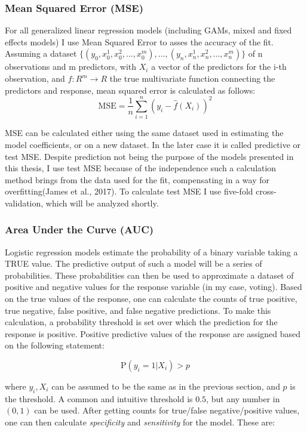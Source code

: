 \documentclass[12pt,twoside]{reedthesis}
\begin{document}
  \subsubsection{Mean Squared Error (MSE)}\label{mean-squared-error-mse}
  
  For all generalized linear regression models (including GAMs, mixed and
  fixed effects models) I use Mean Squared Error to asses the accuracy of
  the fit. Assuming a dataset
  \(\{(y_0, x_0^1, x_0^2, ..., x_0^m),...,(y_n, x_n^1, x_n^2, ..., x_n^m)\}\)
  of n observations and m predictors, with \(X_i\) a vector of the
  predictors for the i-th observation, and \(f:R^m \to R\) the true
  multivariate function connecting the predictors and response, mean
  squared error is calculated as follows:
  \[\text{MSE} = \frac{1}{n}\sum_{i=1}^{n}(y_i - \hat{f}(X_i))^2\]
  
  MSE can be calculated either using the same dataset used in estimating
  the model coefficients, or on a new dataset. In the later case it is
  called predictive or test MSE. Despite prediction not being the purpose
  of the models presented in this thesis, I use test MSE because of the
  independence such a calculation method brings from the data used for the
  fit, compensating in a way for overfitting(James et al., 2017). To
  calculate test MSE I use five-fold cross-validation, which will be
  analyzed shortly.
  
  \subsubsection{Area Under the Curve
  (AUC)}\label{area-under-the-curve-auc}
  
  Logistic regression models estimate the probability of a binary variable
  taking a TRUE value. The predictive output of such a model will be a
  series of probabilities. These probabilities can then be used to
  approximate a dataset of positive and negative values for the response
  variable (in my case, voting). Based on the true values of the response,
  one can calculate the counts of true positive, true negative, false
  positive, and false negative predictions. To make this calculation, a
  probability threshold is set over which the prediction for the response
  is positive. Positive predictive values of the response are assigned
  based on the following statement:
  
  \[\text{P}(y_i = 1|X_i) > p\]
  
  where \(y_i, X_i\) can be assumed to be the same as in the previous
  section, and \(p\) is the threshold. A common and intuitive threshold is
  \(0.5\), but any number in \((0,1)\) can be used. After getting counts
  for true/false negative/positive values, one can then calculate
  \emph{specificity} and \emph{sensitivity} for the model. These are:
  
\end{document}
